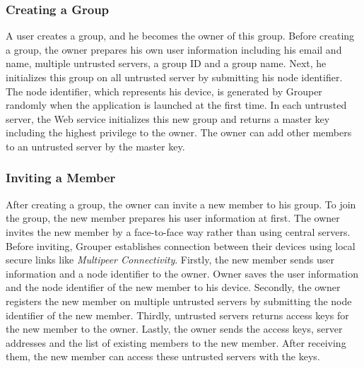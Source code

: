 \documentclass[twocolumn,10pt]{article}
\begin{document}
\subsubsection{Creating a Group}

A user creates a group, and he becomes the owner of this group.  
Before creating a group, the owner prepares his own user information including his email and name, multiple untrusted servers, a group ID and a group name. 
Next, he initializes this group on all untrusted server by submitting his node identifier. 
The node identifier, which represents his device, is generated by Grouper randomly when the application is launched at the first time. 
In each untrusted server, the Web service initializes this new group and returns a master key including the highest privilege to the owner. 
The owner can add other members to an untrusted server by the master key.

\subsubsection{Inviting a Member}

After creating a group, the owner can invite a new member to his group. 
To join the group, the new member prepares his user information at first. 
The owner invites the new member by a face-to-face way rather than using central servers. 
Before inviting, Grouper establishes connection between their devices using local secure links like \emph{Multipeer Connectivity}\cite{mc}. 
Firstly, the new member sends user information and a node identifier to the owner. 
Owner saves the user information and the node identifier of the new member to his device. 
Secondly, the owner registers the new member on multiple untrusted servers by submitting the node identifier of the new member. 
Thirdly, untrusted servers returns access keys for the new member to the owner. 
Lastly, the owner sends the access keys, server addresses and the list of existing members to the new member. 
After receiving them, the new member can access these untrusted servers with the keys.
\end{document}
